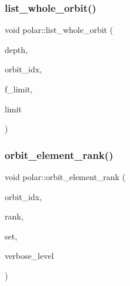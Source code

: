 \mbox{\label{classpolar_a26f04b7c75e45604ab772931ed2916fd}} 
\subsubsection{\texorpdfstring{list\+\_\+whole\+\_\+orbit()}{list\_whole\_orbit()}}
{\footnotesize\ttfamily void polar\+::list\+\_\+whole\+\_\+orbit (\begin{DoxyParamCaption}\item[{\mbox{\hyperlink{galois_8h_a09fddde158a3a20bd2dcadb609de11dc}{I\+NT}}}]{depth,  }\item[{\mbox{\hyperlink{galois_8h_a09fddde158a3a20bd2dcadb609de11dc}{I\+NT}}}]{orbit\+\_\+idx,  }\item[{\mbox{\hyperlink{galois_8h_a09fddde158a3a20bd2dcadb609de11dc}{I\+NT}}}]{f\+\_\+limit,  }\item[{\mbox{\hyperlink{galois_8h_a09fddde158a3a20bd2dcadb609de11dc}{I\+NT}}}]{limit }\end{DoxyParamCaption})}

\mbox{\label{classpolar_a70551ff23175b280b66bce27fe200275}} 
\subsubsection{\texorpdfstring{orbit\+\_\+element\+\_\+rank()}{orbit\_element\_rank()}}
{\footnotesize\ttfamily void polar\+::orbit\+\_\+element\+\_\+rank (\begin{DoxyParamCaption}\item[{\mbox{\hyperlink{galois_8h_a09fddde158a3a20bd2dcadb609de11dc}{I\+NT}} \&}]{orbit\+\_\+idx,  }\item[{\mbox{\hyperlink{galois_8h_a09fddde158a3a20bd2dcadb609de11dc}{I\+NT}} \&}]{rank,  }\item[{\mbox{\hyperlink{galois_8h_a09fddde158a3a20bd2dcadb609de11dc}{I\+NT}} $\ast$}]{set,  }\item[{\mbox{\hyperlink{galois_8h_a09fddde158a3a20bd2dcadb609de11dc}{I\+NT}}}]{verbose\+\_\+level }\end{DoxyParamCaption})}

\mbox{\label{classpolar_abcc67b841c60f84478e531f9facf0b82}} 
